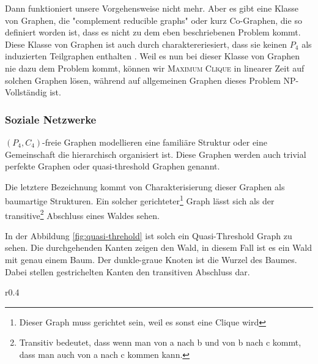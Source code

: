 \documentclass[12pt,a4paper,onecolumn,oneside,titlepage]{article}
\begin{document}
Dann funktioniert unsere Vorgehensweise nicht mehr. 
Aber es gibt eine Klasse von Graphen, die "complement reducible graphs" oder kurz Co-Graphen, die so definiert worden ist, dass es nicht zu dem eben beschriebenen Problem kommt.
Diese Klasse von Graphen ist auch durch charaktereriesiert, dass sie keinen $P_4$ als induzierten Teilgraphen enthalten \cite{NastosG13}.
Weil es nun bei dieser Klasse von Graphen nie dazu dem Problem kommt, können wir \textsc{Maximum Clique} in linearer Zeit auf solchen Graphen lösen, während auf allgemeinen Graphen dieses Problem NP-Vollständig ist.


\subsubsection{Soziale Netzwerke}
$(P_4,C_4)$-freie Graphen modellieren eine familiäre Struktur oder eine Gemeinschaft die hierarchisch organisiert ist. Diese Graphen werden auch trivial perfekte Graphen oder quasi-threshold Graphen genannt\cite{Wolk65}. 

Die letztere Bezeichnung kommt von Charakterisierung dieser Graphen als baumartige Strukturen. Ein solcher gerichteter\footnote{Dieser Graph muss gerichtet sein, weil es sonst eine Clique wird} Graph lässt sich als der transitive\footnote{Transitiv bedeutet, dass wenn man von a nach b und von b nach c kommt, dass man auch von a nach c kommen kann.} Abschluss eines Waldes sehen\cite{BrandesHSW15}. 

In der Abbildung \ref{fig:quasi-threhold} ist solch ein Quasi-Threshold Graph zu sehen. Die durchgehenden Kanten zeigen den Wald, in diesem Fall ist es ein Wald mit genau einem Baum. Der dunkle-graue Knoten ist die Wurzel des Baumes.  Dabei stellen gestrichelten Kanten den transitiven Abschluss dar. 
\begin{wrapfigure}{r}{0.4\textwidth}
  \begin{center}
    


  \end{center}
  \caption{Ein Quasi-Threshold-Graph}
  \label{fig:quasi-threhold}
\end{wrapfigure}
\end{document}
